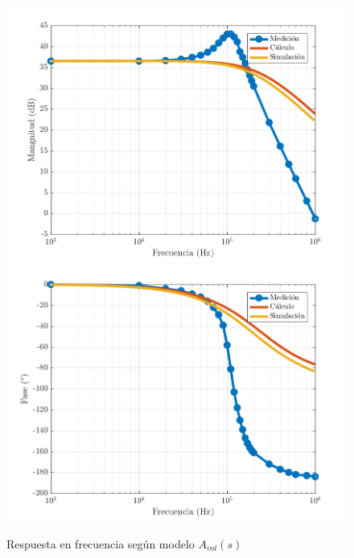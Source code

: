 \documentclass[../../main.tex]{subfiles}
\begin{document}
\begin{figure} [H]
	\centering
	\includegraphics[scale=0.8]{fotos/tc-tp2-ej2-bode-sin-c-mag.png}
	\includegraphics[scale=0.8]{fotos/tc-tp2-ej2-bode-sin-c-fase.png}
	\caption{Respuesta en frecuencia seg\'un modelo $A_{vol}(s)$}
	\label{fig:hf-sin-c}
\end{figure}
\end{document}
